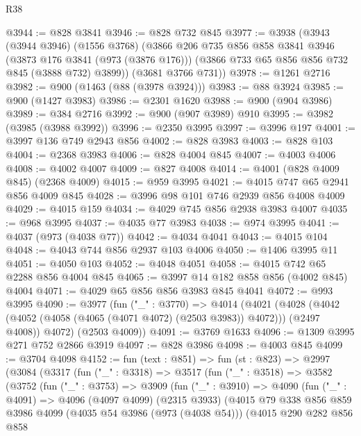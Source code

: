 \begin{lexlean}{R38}
\begin{coremodule}
@3944 := @828 @3841
@3946 := @828 @732 @845
@3977 := @3938
    (@3943
      (@3944 @3946)
      (@1556 @3768)
      (@3866
        @206
        @735
        @856
        @858
        @3841
        @3946
        (@3873 @176 @3841 (@973 (@3876 @176)))
        (@3866 @733 @65 @856 @856 @732 @845 (@3888 @732) @3899))
      (@3681 @3766 @731))
@3978 := @1261 @2716
@3982 := @900 (@1463 (@88 (@3978 @3924)))
@3983 := @88 @3924
@3985 := @900 (@1427 @3983)
@3986 := @2301 @1620
@3988 := @900 (@904 @3986)
@3989 := @384 @2716
@3992 := @900 (@907 @3989) @910
@3995 := @3982 (@3985 (@3988 @3992))
@3996 := @2350 @3995
@3997 := @3996 @197
@4001 := @3997 @136 @749 @2943 @856
@4002 := @828 @3983
@4003 := @828 @103
@4004 := @2368 @3983
@4006 := @828 @4004 @845
@4007 := @4003 @4006
@4008 := @4002 @4007
@4009 := @827 @4008
@4014 := @4001 (@828 @4009 @845) (@2368 @4009)
@4015 := @959 @3995
@4021 := @4015 @747 @65 @2941 @856 @4009 @845
@4028 := @3996 @98 @101 @746 @2939 @856 @4008 @4009
@4029 := @4015 @159
@4034 := @4029 @745 @856 @2938 @3983 @4007
@4035 := @968 @3995
@4037 := @4035 @77 @3983
@4038 := @974 @3995
@4041 := @4037 (@973 (@4038 @77))
@4042 := @4034 @4041
@4043 := @4015 @104
@4048 := @4043 @744 @856 @2937 @103 @4006
@4050 := @1406 @3995 @11
@4051 := @4050 @103
@4052 := @4048 @4051
@4058 := @4015 @742 @65 @2288 @856 @4004 @845
@4065 := @3997 @14 @182 @858 @856 (@4002 @845) @4004
@4071 := @4029 @65 @856 @856 @3983 @845 @4041
@4072 := @993 @3995
@4090 := @3977
    (fun ("_" : @3770) =>
    @4014
      (@4021
        (@4028 (@4042 (@4052 (@4058 (@4065 (@4071 @4072) (@2503 @3983)) @4072))) (@2497 @4008))
        @4072)
      (@2503 @4009))
@4091 := @3769 @1633
@4096 := @1309 @3995 @271 @752 @2866 @3919
@4097 := @828 @3986
@4098 := @4003 @845
@4099 := @3704 @4098
@4152 := fun (text : @851) =>
  fun (st : @823) =>
  @2997
    (@3084
      (@3317
        (fun ("_" : @3318) =>
        @3517
          (fun ("_" : @3518) =>
          @3582
            (@3752
              (fun ("_" : @3753) =>
              @3909
                (fun ("_" : @3910) =>
                @4090
                  (fun ("_" : @4091) =>
                  @4096
                    (@4097 @4099)
                    (@2315 @3933)
                    (@4015
                      @79
                      @338
                      @856
                      @859
                      @3986
                      @4099
                      (@4035 @54 @3986 (@973 (@4038 @54)))
                      (@4015
                        @290
                        @282
                        @856
                        @858

\end{coremodule}
\end{lexlean}
